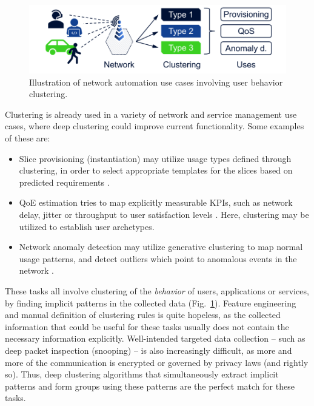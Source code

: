			\begin{figure}[ht]
				\centering
				\includegraphics[width=0.6\linewidth]{figures/07_decorr_ae/use_cases/use_cases.pdf}
				\caption[User behavior clustering use cases]{Illustration of network automation use cases involving user behavior clustering.}
				\label{fig:use_cases}
			\end{figure}
			
			Clustering is already used in a variety of network and service management use cases, where deep clustering could improve current functionality.
			Some examples of these are:
			\begin{itemize}
				\item 
					Slice provisioning (instantiation) may utilize usage types defined through clustering, in order to select appropriate templates for the slices based on predicted requirements \cite{slice}.
					
				\item
					\ac{QoE} estimation tries to map explicitly measurable \acp{KPI}, such as network delay, jitter or throughput to user satisfaction levels \cite{qoe}. Here, clustering may be utilized to establish user archetypes.
					
				\item
					Network anomaly detection may utilize generative clustering to map normal usage patterns, and detect outliers which point to anomalous events in the network \cite{anomaly}.
			\end{itemize}
			
			These tasks all involve clustering of the \textit{behavior} of users, applications or services, by finding implicit patterns in the collected data (Fig.~\ref{fig:use_cases}).
			Feature engineering and manual definition of clustering rules is quite hopeless, as the collected information that could be useful for these tasks usually does not contain the necessary information explicitly.
			Well-intended targeted data collection -- such as deep packet inspection (snooping) -- is also increasingly difficult, as more and more of the communication is encrypted or governed by privacy laws (and rightly so).
			Thus, deep clustering algorithms that simultaneously extract implicit patterns and form groups using these patterns are the perfect match for these tasks.
			
